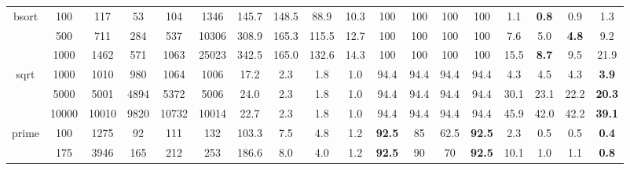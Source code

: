 \documentclass[EPiCempty]{easychair}
\begin{document}
\begin{table}
\begin{scriptsize}
\begin{tabular}{|c|c|cccc|cccc|cccc|cccc|}
\hline
\multirow{3}{*}{bsort} &         100                &   117     &   53     &   104     &    1346     &    145.7     &   148.5     &    88.9    &    10.3     &    100      &   100     &   100     &   100      &    1.1      &    \textbf{0.8}      &    0.9     &    1.3      \\
                            &          500               &    711    &   284     &    537    &    10306     &    308.9     &   165.3     &   115.5     &   12.7      &     100    &   100     &   100     &   100      &    7.6      &    5.0      &    \textbf{4.8}     &     9.2       \\
                            &          1000               &    1462    &   571     &   1063     &   25023      &    342.5     &   165.0     &   132.6     &    14.3     &    100     &   100     &   100     &    100     &    15.5      &     \textbf{8.7}     &    9.5     &    21.9      \\
\hline
\multirow{3}{*}{sqrt} &         1000                &   1010     &   980     &   1064     &    1006     &    17.2     &   2.3     &    1.8    &    1.0     &    94.4      &   94.4     &   94.4     &   94.4      &    4.3      &    4.5      &    4.3     &    \textbf{3.9}      \\
                            &          5000               &    5001    &   4894     &    5372    &    5006     &    24.0    &   2.3     &   1.8     &   1.0      &     94.4      &   94.4     &   94.4     &   94.4      &    30.1      &    23.1      &    22.2     &     \textbf{20.3}       \\
                            &          10000               &    10010    &   9820     &   10732     &   10014      &    22.7     &   2.3     &   1.8     &    1.0     &    94.4      &   94.4     &   94.4     &   94.4     &    45.9      &     42.0     &    42.2     &    \textbf{39.1}      \\
\hline
\multirow{3}{*}{prime}      &         100                &   1275     &   92     &   111     &    132     &    103.3     &   7.5     &   4.8     &    1.2     &    \textbf{92.5}     &   85     &   62.5     &   \textbf{92.5}    &    2.3      &    0.5      &    0.5     &    \textbf{0.4}      \\
                            &         175                &    3946    &    165    &    212    &    253     &    186.6     &    8.0    &   4.0     &    1.2     &    \textbf{92.5}     &   90     &    70    &   \textbf{92.5}      &    10.1      &    1.0      &    1.1     &    \textbf{0.8}      \\

\end{tabular}
\end{scriptsize}
\end{table}
\end{document}

